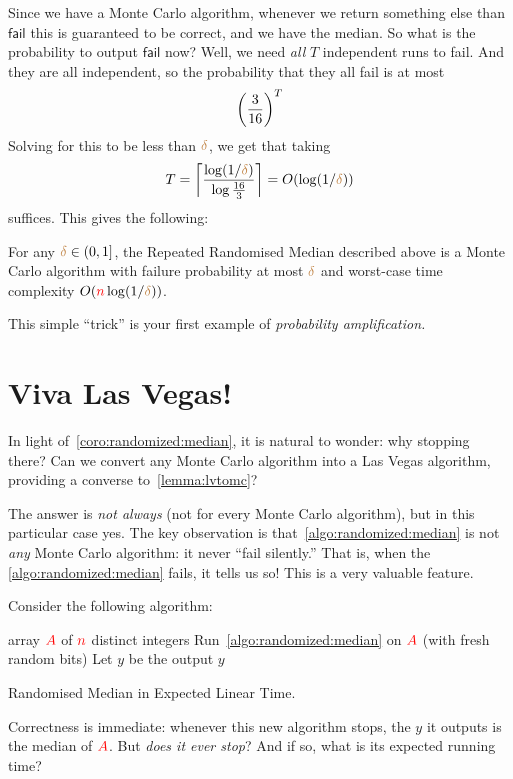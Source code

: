 Since we have a Monte Carlo algorithm, whenever we return something else than $\textsf{fail}$ this is guaranteed to be correct, and we have the median. So what is the probability to output $\textsf{fail}$ now? Well, we need \emph{all} $T$ independent runs to fail. And they are all independent, so the probability that they all fail is at most
\[
    \Paren{\frac{3}{16}}^T
\]
Solving for this to be less than ${\textcolor{brown}{\delta}}$, we get that  taking
\[
    T = \left\lceil \frac{\log(1/{\textcolor{brown}{\delta}})}{\log\frac{16}{3}} \right\rceil = O(\log(1/{\textcolor{brown}{\delta}}))
\]
suffices. This gives the following:
\begin{corollary}
    \label{coro:randomized:median}
    For any ${\textcolor{brown}{\delta}} \in(0,1]$, the Repeated Randomised Median described above is a Monte Carlo algorithm with failure probability at most ${\textcolor{brown}{\delta}}$ and worst-case time complexity $O({\textcolor{red}{n}}\log(1/{\textcolor{brown}{\delta}}))$.
\end{corollary}
\noindent This simple ``trick'' is your first example of \emph{probability amplification.}

\section{Viva Las Vegas!}
In light of~\cref{coro:randomized:median}, it is natural to wonder: why stopping there? Can we convert any Monte Carlo algorithm into a Las Vegas algorithm, providing a converse to~\cref{lemma:lvtomc}?

The answer is \emph{not always} (not for every Monte Carlo algorithm), but in this particular case yes. The key observation is that~\cref{algo:randomized:median} is not \emph{any} Monte Carlo algorithm: it never ``fail silently.'' That is, when the \cref{algo:randomized:median} fails, it tells us so! This is a very valuable feature.

Consider the following algorithm:
\begin{algorithm}[H]
\begin{algorithmic}[1]
    \Require array $\textcolor{red}{A}$ of ${\textcolor{red}{n}}$ distinct integers
    \Repeat
        \State Run~\cref{algo:randomized:median} on $\textcolor{red}{A}$ (with fresh random bits)
        \State Let $y$ be the output
    \label{step:until:exit}
    \State\Return $y$
\end{algorithmic}
    \caption{Randomised Median in Expected Linear Time.}
    \label{algo:randomized:median:lv}
\end{algorithm}
Correctness is immediate: whenever this new algorithm stops, the $y$ it outputs is the median of $\textcolor{red}{A}$. But \emph{does it ever stop}? And if so, what is its expected running time?\medskip

